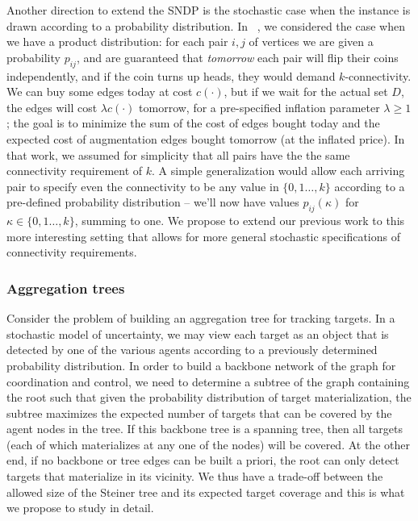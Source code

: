 Another direction to extend the SNDP is the
stochastic case when the instance is drawn according to a probability
distribution. In ~\cite{gkr10}, we considered the case when we have a product
distribution: for each pair $i,j$ of vertices we are given a probability $p_{ij}$,
and are guaranteed that \emph{tomorrow} each pair will flip their coins
independently, and if the coin turns up heads, they would demand
$k$-connectivity. We can buy some edges today at cost $c(\cdot)$, but if
we wait for the actual set $D$, the edges will cost $\lambda c(\cdot)$
tomorrow, for a pre-specified inflation parameter $\lambda \geq 1$; the goal
is to minimize the sum of the cost of edges bought today and the
expected cost of augmentation edges bought tomorrow (at the inflated price).
In that work, we assumed for simplicity that all pairs have the the same
connectivity requirement of $k$. A simple generalization would allow each arriving pair to specify even the connectivity to be any value in $\{0,1\ldots,k\}$ according to a pre-defined probability distribution -- we'll now have values $p_{ij}(\kappa)$ for $\kappa \in \{0,1\ldots,k\}$, summing to one. We propose to extend our previous work to this more interesting setting that allows for more general stochastic specifications of connectivity requirements.

\subsubsection{Aggregation trees}
\label{sec:aggregation}
Consider the problem of building an aggregation tree for tracking
targets.  In a stochastic model of uncertainty, we may view each
target as an object that is detected by one of the various agents
according to a previously determined probability distribution.  In
order to build a backbone network of the graph for coordination and
control, we need to determine a subtree of the graph containing the
root such that given the probability distribution of target
materialization, the subtree maximizes the expected number of targets
that can be covered by the agent nodes in the tree. If this backbone
tree is a spanning tree, then all targets (each of which materializes
at any one of the nodes) will be covered. At the other end, if no
backbone or tree edges can be built a priori, the root can only detect
targets that materialize in its vicinity. We thus have a trade-off
between the allowed size of the Steiner tree and its expected target
coverage and this is what we propose to study in detail.

